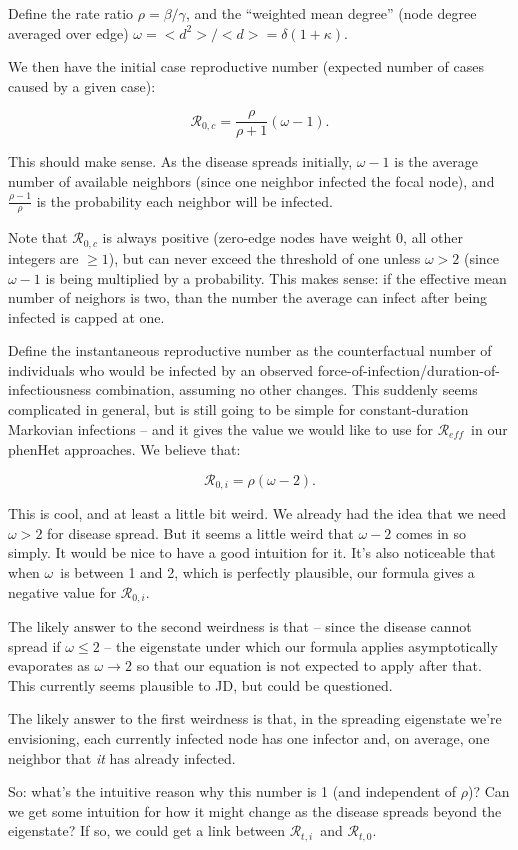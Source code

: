 \documentclass[12pt]{article}
\begin{document}
\newcommand{\Rx}[1]{\ensuremath{\mathcal{R}_{#1}}}
\newcommand{\emd}{\ensuremath{\omega}}

Define the rate ratio $\rho = \beta/\gamma$, and the “weighted mean degree” (node degree averaged over edge) $\emd = <d^2>/<d> = \delta(1+
\kappa)$.

We then have the initial case reproductive number (expected number of cases caused by a given case):

$$ \Rx{0,c} = \frac{\rho}{\rho+1}(\emd-1). $$

This should make sense. As the disease spreads initially, $\emd - 1$ is the average number of available neighbors (since one neighbor infected the focal node), and $\frac{\rho-1}{\rho}$ is the probability each neighbor will be infected. 

Note that \Rx{0,c} is always positive (zero-edge nodes have weight 0, all other integers are $\geq1$), but can never exceed the threshold of one unless $\emd>2$ (since $\emd-1$ is being multiplied by a probability. This makes sense: if the effective mean number of neighors is two, than the number the average can infect after being infected is capped at one.

Define the instantaneous reproductive number as the counterfactual number of individuals who would be infected by an observed force-of-infection/duration-of-infectiousness combination, assuming no other changes. This suddenly seems complicated in general, but is still going to be simple for constant-duration Markovian infections -- and it gives the value we would like to use for \Rx{\mathit{eff}}\ in our phenHet approaches. We believe that:

$$ \Rx{0,i} = \rho(\emd-2).$$

This is cool, and at least a little bit weird. We already had the idea that we need $\emd>2$ for disease spread. But it seems a little weird that $\emd-2$ comes in so simply. It would be nice to have a good intuition for it. It's also noticeable that when \emd\ is between 1 and 2, which is perfectly plausible, our formula gives a negative value for \Rx{0,i}.

The likely answer to the second weirdness is that -- since the disease cannot spread if $\emd\leq2$ -- the eigenstate under which our formula applies asymptotically evaporates as $\emd\to2$ so that our equation is not expected to apply after that. This currently seems plausible to JD, but could be questioned.

The likely answer to the first weirdness is that, in the spreading eigenstate we're envisioning, each currently infected node has one infector and, on average, one neighbor that \emph{it} has already infected.

So: what's the intuitive reason why this number is 1 (and independent of $\rho$)? Can we get some intuition for how it might change as the disease spreads beyond the eigenstate? If so, we could get a link between \Rx{t,i}\ and \Rx{t,0}.
\end{document}
